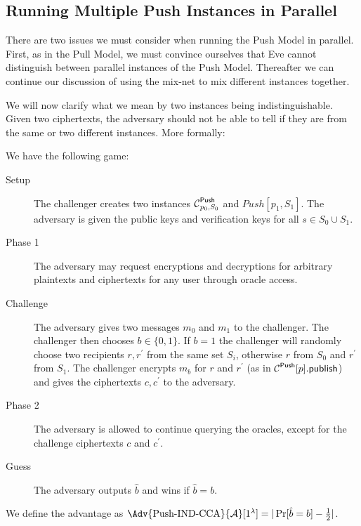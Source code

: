 \subsection{Running Multiple Push Instances in Parallel}
\label{ParallelPush}

There are two issues we must consider when running the Push Model in parallel.
First, as in the Pull Model, we must convince ourselves that Eve cannot 
distinguish between parallel instances of the Push Model.
Thereafter we can continue our discussion of using the mix-net to mix different
instances together.

We will now clarify what we mean by two instances being indistinguishable.
Given two ciphertexts, the adversary should not be able to tell if they are 
from the same or two different instances.
More formally:

\begin{definition}
  We have the following game:
  \begin{description}
    \item[Setup] The challenger creates two instances \(\Push[p_0, S_0]\) and 
      \(Push[p_1, S_1]\).
      The adversary is given the public keys and verification keys for all 
      \(s\in S_0\cup S_1\).

    \item[Phase 1] The adversary may request encryptions and decryptions for 
      arbitrary plaintexts and ciphertexts for any user through oracle access.

    \item[Challenge] The adversary gives two messages \(m_0\) and \(m_1\) to 
      the challenger.
      The challenger then chooses \(b\in \{0, 1\}\).
      If \(b = 1\) the challenger will randomly choose two recipients \(r, 
        r^\prime\) from the same set \(S_i\), otherwise \(r\) from \(S_0\) and 
      \(r^\prime\) from \(S_1\).
      The challenger encrypts \(m_b\) for \(r\) and \(r^\prime\) (as in 
      \(\pnpub{p}\)) and gives the ciphertexts \(c, c^\prime\) to the 
      adversary.

    \item[Phase 2] The adversary is allowed to continue querying the oracles, 
      except for the challenge ciphertexts \(c\) and \(c^\prime\).

    \item[Guess] The adversary outputs \(\hat{b}\) and wins if \(\hat{b} = b\).
  \end{description}
  We define the advantage as \(\Adv{\text{Push-IND-CCA}}{\A}[1^\lambda] 
    = |\Pr[\hat{b} = b] - \frac{1}{2}|\).
\end{definition}

